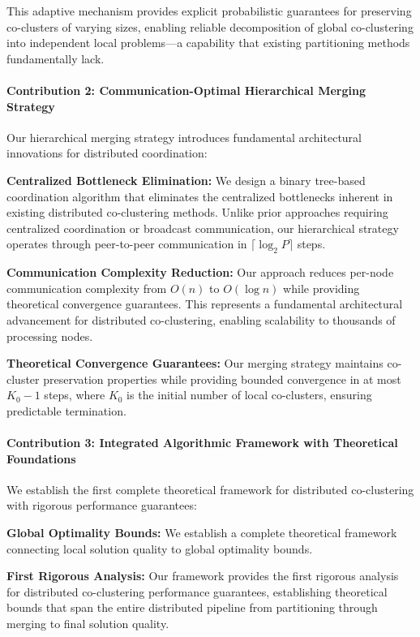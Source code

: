 \documentclass{ar2rc}
\theoremstyle{definition}
\theoremstyle{remark} %
\begin{document}
This adaptive mechanism provides explicit probabilistic guarantees for preserving co-clusters of varying sizes, enabling reliable decomposition of global co-clustering into independent local problems—a capability that existing partitioning methods fundamentally lack.

\paragraph{Contribution 2: Communication-Optimal Hierarchical Merging Strategy}

Our hierarchical merging strategy introduces fundamental architectural innovations for distributed coordination:

\textbf{Centralized Bottleneck Elimination:} We design a binary tree-based coordination algorithm that eliminates the centralized bottlenecks inherent in existing distributed co-clustering methods. Unlike prior approaches requiring centralized coordination or broadcast communication, our hierarchical strategy operates through peer-to-peer communication in $\lceil \log_2 P \rceil$ steps.

\textbf{Communication Complexity Reduction:} Our approach reduces per-node communication complexity from $O(n)$ to $O(\log n)$ while providing theoretical convergence guarantees. This represents a fundamental architectural advancement for distributed co-clustering, enabling scalability to thousands of processing nodes.

\textbf{Theoretical Convergence Guarantees:} Our merging strategy maintains co-cluster preservation properties while providing bounded convergence in at most $K_0-1$ steps, where $K_0$ is the initial number of local co-clusters, ensuring predictable termination.

\paragraph{Contribution 3: Integrated Algorithmic Framework with Theoretical Foundations}

We establish the first complete theoretical framework for distributed co-clustering with rigorous performance guarantees:

\textbf{Global Optimality Bounds:} We establish a complete theoretical framework connecting local solution quality to global optimality bounds.

\textbf{First Rigorous Analysis:} Our framework provides the first rigorous analysis for distributed co-clustering performance guarantees, establishing theoretical bounds that span the entire distributed pipeline from partitioning through merging to final solution quality.
\end{document}
